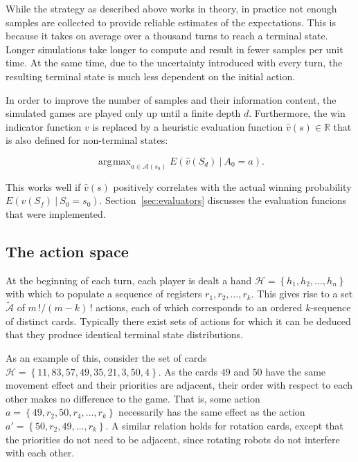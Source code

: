 \documentclass{article}
\newcommand{\reals}{\mathbb{R}}
\newcommand{\Action}{A}
\newcommand{\action}{a}
\newcommand{\actions}{\mathcal{A}}
\newcommand{\randomState}{S}
\newcommand{\state}{s}
\newcommand{\hand}{\mathcal{H}}
\newcommand{\depth}{d}
\newcommand{\evaluator}{v}
\newcommand{\expectation}[2]{E\left({#1\given#2}\right)}
\newcommand{\given}[1][]{\:#1\vert\:}
\newcommand{\factorial}[1]{#1\,!}
\DeclareMathOperator*{\argmax}{\arg\!\max}
\newcommand{\initial}{0}
\newcommand{\final}{f}
\begin{document}
While the strategy as described above works in theory, in practice not enough samples are collected to provide reliable estimates of the expectations.  This is because it takes on average over a thousand turns to reach a terminal state.  Longer simulations take longer to compute and result in fewer samples per unit time.  At the same time, due to the uncertainty introduced with every turn, the resulting terminal state is much less dependent on the initial action.

In order to improve the number of samples and their information content, the simulated games are played only up until a finite depth $\depth$.  Furthermore, the win indicator function $\evaluator$ is replaced by a heuristic evaluation function $\hat{\evaluator}\left(\state\right) \in \reals$ that is also defined for non-terminal states:

\[
\argmax_{\action \in \actions\left(\state_\initial\right)} \expectation{\hat{\evaluator}\left(\randomState_\depth\right)}{\Action_\initial=\action}.
\]

This works well if $\hat{\evaluator}\left(\state\right)$ positively correlates with the actual winning probability $\expectation{\evaluator\left(\randomState_\final\right)}{\randomState_\initial = \state_\initial}$.  Section~\ref{sec:evaluators} discusses the evaluation funcions that were implemented.

\subsection{The action space}

At the beginning of each turn, each player is dealt a hand $\hand = \left\{h_1,h_2,\ldots,h_n\right\}$ with which to populate a sequence of registers $r_1,r_2,\ldots,r_k$.  This gives rise to a set $\tilde{\actions}$ of $\factorial{m}/\factorial{\left(m-k\right)}$ actions, each of which corresponds to an ordered $k$-sequence of distinct cards.  Typically there exist sets of actions for which it can be deduced that they produce identical terminal state distributions.

As an example of this, consider the set of cards $\hand = \left\{11,83,57,49,35,21, 3,50, 4\right\}$.  As the cards $49$ and $50$ have the same movement effect and their priorities are adjacent, their order with respect to each other makes no difference to the game.  That is, some action $\action = \left\{49,r_2,50,r_4,\ldots,r_k\right\}$ necessarily has the same effect as the action $\action' = \left\{50,r_2,49,\ldots,r_k\right\}$.  A similar relation holds for rotation cards, except that the priorities do not need to be adjacent, since rotating robots do not interfere with each other.
\end{document}
